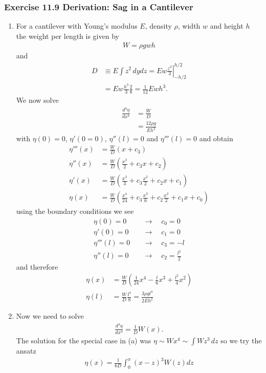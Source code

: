 \documentclass[10pt,a4paper]{article}
\theoremstyle{definition}
\begin{document}
\subsubsection{Exercise 11.9 Derivation: Sag in a Cantilever}
\begin{enumerate}[label=(\alph*)]
\item For a cantilever with Young's modulus $E$, density $\rho$, width $w$ and height $h$ the weight per length is given by
\begin{align}
    W=\rho g w h
\end{align}
and
\begin{align}
    D&\equiv E\int z^2\,dydz=Ew \left.\frac{z^3}{3}\right|_{-h/2}^{h/2}\\
    &=Ew\frac{h^3}{3}\frac{2}{8}=\frac{1}{12}Ewh^3.
\end{align}
We now solve
\begin{align}
    \frac{d^4\eta}{dx^4}
    &=\frac{W}{D}\\
    &=\frac{12\rho g}{Eh^2}
\end{align}
with $\eta(0)=0$, $\eta'(0=0)$, $\eta''(l)=0$ and $\eta'''(l)=0$ and obtain
\begin{align}
    \eta'''(x)&=\frac{W}{D}\left(x+c_3\right)\\
    \eta''(x)&=\frac{W}{D}\left(\frac{x^2}{2}+c_3x+c_2\right)\\
    \eta'(x)&=\frac{W}{D}\left(\frac{x^3}{3}+c_3\frac{x^2}{2}+c_2x +c_1\right)\\
    \eta(x)&=\frac{W}{D}\left(\frac{x^4}{24}+c_3\frac{x^3}{6}+c_2\frac{x^2}{2} +c_1x+c_0\right)
\end{align}
using the boundary conditions we see
\begin{align}
    \eta(0)=0    \quad&\rightarrow\quad c_0=0\\
    \eta'(0)=0   \quad&\rightarrow\quad c_1=0\\
    \eta'''(l)=0 \quad&\rightarrow\quad c_3=-l\\
    \eta''(l)=0  \quad&\rightarrow\quad c_2=\frac{l^2}{2}
\end{align}
and therefore
\begin{align}
    \eta(x)&=\frac{W}{D}\left(\frac{1}{24}x^4-\frac{l}{6}x^3+\frac{l^2}{4}x^2\right)\\
    \eta(l)&=\frac{W}{D}\frac{l^4}{8}=\frac{3\rho gl^4}{2Eh^2}
\end{align}

\item Now we need to solve
\begin{align}
    \frac{d^4\eta}{dx^4}=\frac{1}{D}W(x).
\end{align}
The solution for the special case in (a) was $\eta\sim W x^4\sim\int W z^3\,dz$ so we try the ansatz
\begin{align}
    \eta(x)=\frac{1}{6D}\int_0^x(x-z)^3W(z)dz
\end{align}

\end{enumerate}
\end{document}

